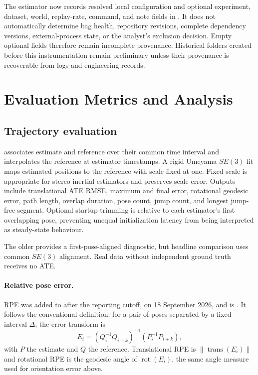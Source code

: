 The estimator now records resolved local configuration and optional experiment,
dataset, world, replay-rate, command, and note fields in
. It does not automatically determine bag health,
repository revisions, complete dependency versions, external-process state, or
the analyst's exclusion decision. Empty optional fields therefore remain
incomplete provenance. Historical folders created before this instrumentation
remain preliminary unless their provenance is recoverable from logs and
engineering records.

\section{Evaluation Metrics and Analysis}
\label{sec:evaluation-method}

\subsection{Trajectory evaluation}
\label{sec:method-trajectory}

 associates estimate and reference over their common
time interval and interpolates the reference at estimator timestamps. A rigid
Umeyama $SE(3)$ fit maps estimated positions to the reference with scale fixed at
one. Fixed scale is appropriate for stereo-inertial estimators and preserves
scale error. Outputs include translational ATE RMSE, maximum and final error,
rotational geodesic error, path length, overlap duration, pose count, jump count,
and longest jump-free segment. Optional startup trimming is relative to each
estimator's first overlapping pose, preventing unequal initialization latency
from being interpreted as steady-state behaviour.

The older  provides a first-pose-aligned diagnostic, but
headline comparison uses common $SE(3)$ alignment. Real data without independent
ground truth receives no ATE.

\paragraph{Relative pose error.} RPE was added to 
after the reporting cutoff, on 18 September 2026, and is
. It follows the
conventional definition: for a pair of poses separated by a fixed interval
$\Delta$, the error transform is
\begin{equation}
  E_i = \left(Q_i^{-1}Q_{i+k}\right)^{-1}\left(P_i^{-1}P_{i+k}\right),
  \label{eq:rpe}
\end{equation}
with $P$ the estimate and $Q$ the reference. Translational RPE is
$\lVert\operatorname{trans}(E_i)\rVert$ and rotational RPE is the geodesic angle
of $\operatorname{rot}(E_i)$, the same angle measure used for orientation error
above.


